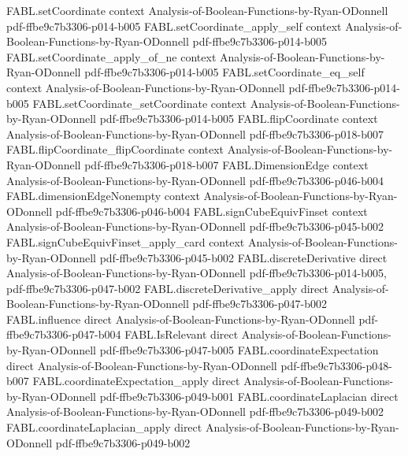 \begin{theorem}
\proofstep
  {FABL.setCoordinate}
  {context}
  {Analysis-of-Boolean-Functions-by-Ryan-ODonnell}
  {pdf-ffbe9c7b3306-p014-b005}
\proofstep
  {FABL.setCoordinate_apply_self}
  {context}
  {Analysis-of-Boolean-Functions-by-Ryan-ODonnell}
  {pdf-ffbe9c7b3306-p014-b005}
\proofstep
  {FABL.setCoordinate_apply_of_ne}
  {context}
  {Analysis-of-Boolean-Functions-by-Ryan-ODonnell}
  {pdf-ffbe9c7b3306-p014-b005}
\proofstep
  {FABL.setCoordinate_eq_self}
  {context}
  {Analysis-of-Boolean-Functions-by-Ryan-ODonnell}
  {pdf-ffbe9c7b3306-p014-b005}
\proofstep
  {FABL.setCoordinate_setCoordinate}
  {context}
  {Analysis-of-Boolean-Functions-by-Ryan-ODonnell}
  {pdf-ffbe9c7b3306-p014-b005}
\proofstep
  {FABL.flipCoordinate}
  {context}
  {Analysis-of-Boolean-Functions-by-Ryan-ODonnell}
  {pdf-ffbe9c7b3306-p018-b007}
\proofstep
  {FABL.flipCoordinate_flipCoordinate}
  {context}
  {Analysis-of-Boolean-Functions-by-Ryan-ODonnell}
  {pdf-ffbe9c7b3306-p018-b007}
\proofstep
  {FABL.DimensionEdge}
  {context}
  {Analysis-of-Boolean-Functions-by-Ryan-ODonnell}
  {pdf-ffbe9c7b3306-p046-b004}
\proofstep
  {FABL.dimensionEdgeNonempty}
  {context}
  {Analysis-of-Boolean-Functions-by-Ryan-ODonnell}
  {pdf-ffbe9c7b3306-p046-b004}
\proofstep
  {FABL.signCubeEquivFinset}
  {context}
  {Analysis-of-Boolean-Functions-by-Ryan-ODonnell}
  {pdf-ffbe9c7b3306-p045-b002}
\proofstep
  {FABL.signCubeEquivFinset_apply_card}
  {context}
  {Analysis-of-Boolean-Functions-by-Ryan-ODonnell}
  {pdf-ffbe9c7b3306-p045-b002}
\proofstep
  {FABL.discreteDerivative}
  {direct}
  {Analysis-of-Boolean-Functions-by-Ryan-ODonnell}
  {pdf-ffbe9c7b3306-p014-b005,
    pdf-ffbe9c7b3306-p047-b002}
\proofstep
  {FABL.discreteDerivative_apply}
  {direct}
  {Analysis-of-Boolean-Functions-by-Ryan-ODonnell}
  {pdf-ffbe9c7b3306-p047-b002}
\proofstep
  {FABL.influence}
  {direct}
  {Analysis-of-Boolean-Functions-by-Ryan-ODonnell}
  {pdf-ffbe9c7b3306-p047-b004}
\proofstep
  {FABL.IsRelevant}
  {direct}
  {Analysis-of-Boolean-Functions-by-Ryan-ODonnell}
  {pdf-ffbe9c7b3306-p047-b005}
\proofstep
  {FABL.coordinateExpectation}
  {direct}
  {Analysis-of-Boolean-Functions-by-Ryan-ODonnell}
  {pdf-ffbe9c7b3306-p048-b007}
\proofstep
  {FABL.coordinateExpectation_apply}
  {direct}
  {Analysis-of-Boolean-Functions-by-Ryan-ODonnell}
  {pdf-ffbe9c7b3306-p049-b001}
\proofstep
  {FABL.coordinateLaplacian}
  {direct}
  {Analysis-of-Boolean-Functions-by-Ryan-ODonnell}
  {pdf-ffbe9c7b3306-p049-b002}
\proofstep
  {FABL.coordinateLaplacian_apply}
  {direct}
  {Analysis-of-Boolean-Functions-by-Ryan-ODonnell}
  {pdf-ffbe9c7b3306-p049-b002}
\proofstep

\end{theorem}
